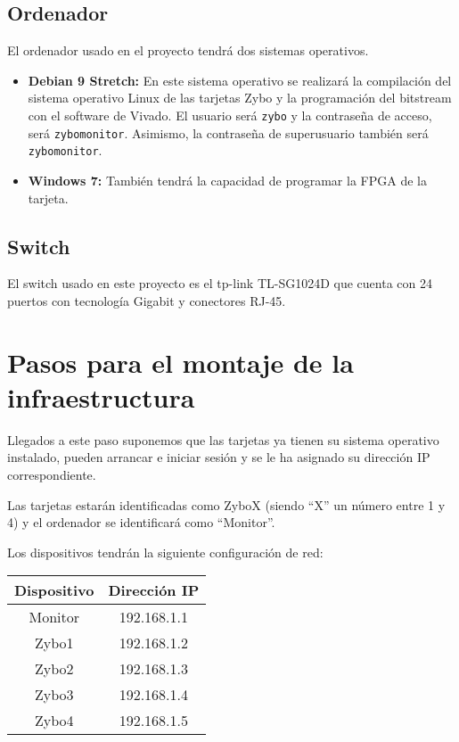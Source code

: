 \documentclass[12pt,letterpaper]{article}
\begin{document}
%

\newpage

\subsection{Ordenador}
El ordenador usado en el proyecto tendrá dos sistemas operativos.
\begin{itemize}
	\item \textbf{Debian 9 Stretch:} En este sistema operativo se realizará la compilación del sistema operativo Linux de las tarjetas Zybo y la programación del bitstream con el software de Vivado. El usuario será \texttt{zybo} y la contraseña de acceso, será \texttt{zybomonitor}. Asimismo, la contraseña de superusuario también será \texttt{zybomonitor}.
	\item \textbf{Windows 7:} También tendrá la capacidad de programar la FPGA de la tarjeta.
\end{itemize}

\subsection{Switch}
El switch usado en este proyecto es el tp-link TL-SG1024D que cuenta con 24 puertos con tecnología Gigabit y conectores RJ-45.


\section{Pasos para el montaje de la infraestructura}
Llegados a este paso suponemos que las tarjetas ya tienen su sistema operativo instalado, pueden arrancar e iniciar sesión y se le ha asignado su dirección IP correspondiente.

Las tarjetas estarán identificadas como ZyboX (siendo ``X'' un número entre 1 y 4) y el ordenador se identificará como ``Monitor''.

Los dispositivos tendrán la siguiente configuración de red:
\begin{table}[h]
	\centering
	\begin{tabular}{|c|c|}
		\hline
		\textbf{Dispositivo} & \textbf{Dirección IP} \\ \hline
		Monitor & 192.168.1.1 \\ \hline
		Zybo1 & 192.168.1.2 \\ \hline
		Zybo2 & 192.168.1.3 \\ \hline
		Zybo3 & 192.168.1.4 \\ \hline
		Zybo4 & 192.168.1.5 \\ \hline
	\end{tabular}
\end{table}
\end{document}
